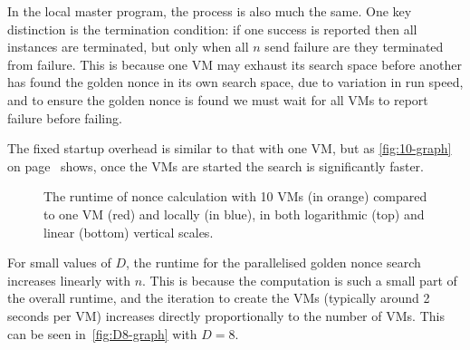 \documentclass[letterpaper,twocolumn,11pt]{article}
\begin{document}
In the local master program, the process is also much the same. One key distinction is the termination condition: if one success is reported then all instances are terminated, but only when all $n$ send failure are they terminated from failure. This is because one VM may exhaust its search space before another has found the golden nonce in its own search space, due to variation in run speed, and to ensure the golden nonce is found we must wait for all VMs to report failure before failing.

The fixed startup overhead is similar to that with one VM, but as \autoref{fig:10-graph} on page~\pageref{fig:10-graph} shows, once the VMs are started the search is significantly faster.

\begin{figure}[p]
\noindent{}
\noindent{}
\caption{The runtime of nonce calculation with 10 VMs (in orange) compared to one VM (red) and locally (in blue), in both logarithmic (top) and linear (bottom) vertical scales.}\label{fig:10-graph}
\end{figure}

For small values of $D$, the runtime for the parallelised golden nonce search increases linearly with $n$. This is because the computation is such a small part of the overall runtime, and the iteration to create the VMs (typically around 2 seconds per VM) increases directly proportionally to the number of VMs. This can be seen in~\autoref{fig:D8-graph} with $D=8$.
\end{document}
